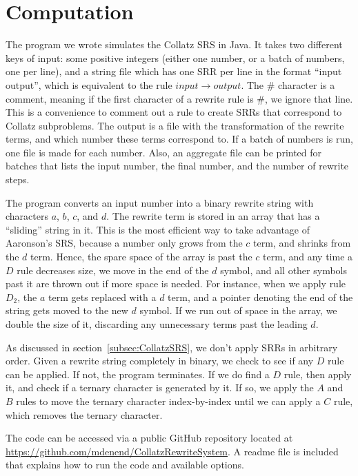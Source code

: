 \section{Computation} \label{subsec:rewritecomp}
The program we wrote simulates the Collatz SRS in Java. It takes two different keys of input: some positive integers (either one number, or a batch of numbers, one per line), and a string file which has one SRR per line in the format ``input output'', which is equivalent to the rule $input \rightarrow output$. The \# character is a comment, meaning if the first character of a rewrite rule is \#, we ignore that line. This is a convenience to comment out a rule to create SRRs that correspond to Collatz subproblems. The output is a file with the transformation of the rewrite terms, and which number these terms correspond to. If a batch of numbers is run, one file is made for each number. Also, an aggregate file can be printed for batches that lists the input number, the final number, and the number of rewrite steps. \par
The program converts an input number into a binary rewrite string with characters $a$, $b$, $c$, and $d$. The rewrite term is stored in an array that has a ``sliding'' string in it. This is the most efficient way to take advantage of Aaronson's SRS, because a number only grows from the $c$ term, and shrinks from the $d$ term. Hence, the spare space of the array is past the $c$ term, and any time a $D$ rule decreases size, we move in the end of the $d$ symbol, and all other symbols past it are thrown out if more space is needed. For instance, when we apply rule $D_2$, the $a$ term gets replaced with a $d$ term, and a pointer denoting the end of the string gets moved to the new $d$ symbol. If we run out of space in the array, we double the size of it, discarding any unnecessary terms past the leading $d$. \par
As discussed in section~\ref{subsec:CollatzSRS}, we don't apply SRRs in arbitrary order. Given a rewrite string completely in binary, we check to see if any $D$ rule can be applied. If not, the program terminates. If we do find a $D$ rule, then apply it, and check if a ternary character is generated by it. If so, we apply the $A$ and $B$ rules to move the ternary character index-by-index until we can apply a $C$ rule, which removes the ternary character. \par
The code can be accessed via a public GitHub repository located at \url{https://github.com/mdenend/CollatzRewriteSystem}. A readme file is included that explains how to run the code and available options.


